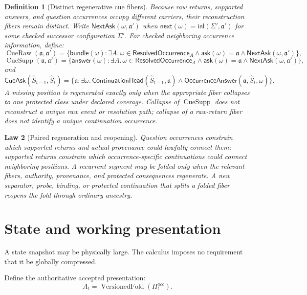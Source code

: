\documentclass[11pt,oneside]{article}
\newtheorem{definition}{Definition}[section]
\newtheorem{law}[definition]{Law}
\newcommand{\CueRaw}{\operatorname{CueRaw}}
\newcommand{\CueSupp}{\operatorname{CueSupp}}
\newcommand{\AskRef}{\mathfrak a}
\begin{document}
\begin{definition}[Distinct regenerative cue fibers]\label{def:paired-cue-fibers}
Because raw returns, supported answers, and question occurrences occupy different carriers, their
reconstruction fibers remain distinct.  Write \(\mathsf{NextAsk}(\omega,\AskRef')\) when
\(\mathsf{next}(\omega)=\mathsf{inl}(\Sigma',\AskRef')\) for some checked successor configuration
\(\Sigma'\).  For checked neighboring occurrence information, define:
\[
\CueRaw(\AskRef,\AskRef')
=
\{\mathsf{bundle}(\omega):\exists A.\,
\omega\in\mathsf{ResolvedOccurrence}_A
\land\mathsf{ask}(\omega)=\AskRef
\land\mathsf{NextAsk}(\omega,\AskRef')\},
\]
\[
\CueSupp(\AskRef,\AskRef')
=
\{\mathsf{answer}(\omega):\exists A.\,
\omega\in\mathsf{ResolvedOccurrence}_A
\land\mathsf{ask}(\omega)=\AskRef
\land\mathsf{NextAsk}(\omega,\AskRef')\},
\]
and
\[
\mathsf{CueAsk}(\widehat S_{t-1},\widehat S_t)
=
\{\AskRef:\exists\omega.\,
\mathsf{ContinuationHead}(\widehat S_{t-1},\AskRef)
\land
\mathsf{OccurrenceAnswer}(\AskRef,\widehat S_t,\omega)\}.
\]
A missing position is regenerated exactly only when the appropriate fiber collapses to one
protected class under declared coverage.  Collapse of \(\CueSupp\) does not reconstruct a unique
raw event or resolution path; collapse of a raw-return fiber does not identify a unique
continuation occurrence.
\end{definition}

\begin{law}[Paired regeneration and reopening]\label{law:paired-regeneration}
Question occurrences constrain which supported returns and actual provenance could lawfully connect
them; supported returns constrain which occurrence-specific continuations could connect neighboring
positions.  A recurrent segment may be folded only when the relevant fibers, authority,
provenance, and protected consequences regenerate.  A new separator, probe, binding, or protected
continuation that splits a folded fiber reopens the fold through ordinary ancestry.
\end{law}

\section{State and working presentation}

A state snapshot may be physically large.  The calculus imposes no requirement that it be globally compressed.

Define the authoritative accepted presentation:
\[
\boxed{
A_t=\operatorname{VersionedFold}(H_t^{acc}).
}
\]
\end{document}
